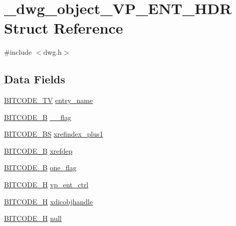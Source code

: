 \hypertarget{struct__dwg__object__VP__ENT__HDR}{\section{\-\_\-dwg\-\_\-object\-\_\-\-V\-P\-\_\-\-E\-N\-T\-\_\-\-H\-D\-R \-Struct \-Reference}
\label{struct__dwg__object__VP__ENT__HDR}
}


{\ttfamily \#include $<$dwg.\-h$>$}

\subsection*{\-Data \-Fields}
\begin{DoxyCompactItemize}
\item 
\hyperlink{dwg_8h_a2a7e040c6e36ca039b03608679ecaf7c}{\-B\-I\-T\-C\-O\-D\-E\-\_\-\-T\-V} \hyperlink{struct__dwg__object__VP__ENT__HDR_a9bee52e469a91f8fa5dbd1a14f803f75}{entry\-\_\-name}
\item 
\hyperlink{dwg_8h_ab533b1f62d9086749e3bb5b67e9f224e}{\-B\-I\-T\-C\-O\-D\-E\-\_\-\-B} \hyperlink{struct__dwg__object__VP__ENT__HDR_a7b2d61a2f5e0fd5ed784db498cf9dbfb}{\-\_\-\_\-flag}
\item 
\hyperlink{dwg_8h_a94297606fbd4a4ff97e8add284af0809}{\-B\-I\-T\-C\-O\-D\-E\-\_\-\-B\-S} \hyperlink{struct__dwg__object__VP__ENT__HDR_a0213b867c66ce73a525e481cc161ede2}{xrefindex\-\_\-plus1}
\item 
\hyperlink{dwg_8h_ab533b1f62d9086749e3bb5b67e9f224e}{\-B\-I\-T\-C\-O\-D\-E\-\_\-\-B} \hyperlink{struct__dwg__object__VP__ENT__HDR_ab5f01c72f3c66670f648ebcb3d13e90b}{xrefdep}
\item 
\hyperlink{dwg_8h_ab533b1f62d9086749e3bb5b67e9f224e}{\-B\-I\-T\-C\-O\-D\-E\-\_\-\-B} \hyperlink{struct__dwg__object__VP__ENT__HDR_ac98cadd791a153b7a2b9ee84cbd9adee}{one\-\_\-flag}
\item 
\hyperlink{dwg_8h_a7c700e94e047a97ba8c24bdfe4029dc3}{\-B\-I\-T\-C\-O\-D\-E\-\_\-\-H} \hyperlink{struct__dwg__object__VP__ENT__HDR_a45f34935886a29be7820ffa71905bb1f}{vp\-\_\-ent\-\_\-ctrl}
\item 
\hyperlink{dwg_8h_a7c700e94e047a97ba8c24bdfe4029dc3}{\-B\-I\-T\-C\-O\-D\-E\-\_\-\-H} \hyperlink{struct__dwg__object__VP__ENT__HDR_a4b0ef0d798dcad3878eefd450ef09141}{xdicobjhandle}
\item 
\hyperlink{dwg_8h_a7c700e94e047a97ba8c24bdfe4029dc3}{\-B\-I\-T\-C\-O\-D\-E\-\_\-\-H} \hyperlink{struct__dwg__object__VP__ENT__HDR_a6e0bc572e3d3121f2ed45dae0b4cec7f}{null}
\end{DoxyCompactItemize}


